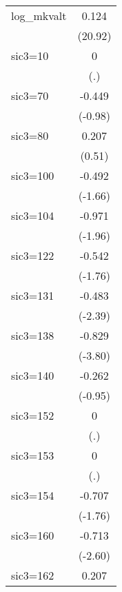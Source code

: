 \begin{table}[htbp]
\begin{tabular*}{0.8\hsize}{@{\hskip\tabcolsep\extracolsep\fill}l*{1}{c}}
log\_mkvalt          &       0.124\sym{***}\\
                    &     (20.92)         \\
\addlinespace
sic3=10             &           0         \\
                    &         (.)         \\
\addlinespace
sic3=70             &      -0.449         \\
                    &     (-0.98)         \\
\addlinespace
sic3=80             &       0.207         \\
                    &      (0.51)         \\
\addlinespace
sic3=100            &      -0.492         \\
                    &     (-1.66)         \\
\addlinespace
sic3=104            &      -0.971\sym{*}  \\
                    &     (-1.96)         \\
\addlinespace
sic3=122            &      -0.542         \\
                    &     (-1.76)         \\
\addlinespace
sic3=131            &      -0.483\sym{*}  \\
                    &     (-2.39)         \\
\addlinespace
sic3=138            &      -0.829\sym{***}\\
                    &     (-3.80)         \\
\addlinespace
sic3=140            &      -0.262         \\
                    &     (-0.95)         \\
\addlinespace
sic3=152            &           0         \\
                    &         (.)         \\
\addlinespace
sic3=153            &           0         \\
                    &         (.)         \\
\addlinespace
sic3=154            &      -0.707         \\
                    &     (-1.76)         \\
\addlinespace
sic3=160            &      -0.713\sym{**} \\
                    &     (-2.60)         \\
\addlinespace
sic3=162            &       0.207         \\

\end{tabular*}
\end{table}
